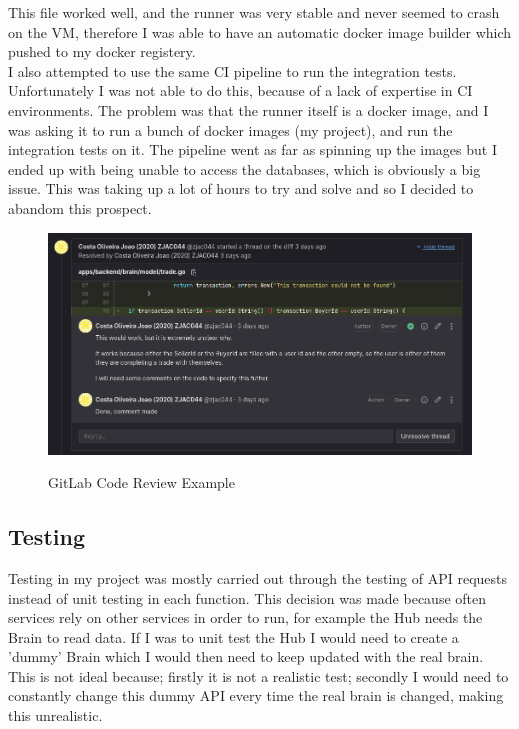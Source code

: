 \documentclass[titlepage]{article}
\begin{document}
This file worked well, and the runner was very stable and never seemed to crash on the VM, therefore I was able to have an automatic docker image builder which pushed to my docker registery. \\

I also attempted to use the same CI pipeline to run the integration tests. Unfortunately I was not able to do this, because of a lack of expertise in CI environments. The problem was that the runner itself is a docker image, and I was asking it to run a bunch of docker images (my project), and run the integration tests on it. The pipeline went as far as spinning up the images but I ended up with being unable to access the databases, which is obviously a big issue. This was taking up a lot of hours to try and solve and so I decided to abandom this prospect. 

\begin{figure}[h!]
  \caption{GitLab Code Review Example}
\hspace*{-3cm}
\includegraphics[width=1.5\textwidth]{../Diagrams/GitLab.png}
\label{gitlab}
\end{figure}

\pagebreak
\subsection{Testing}
Testing in my project was mostly carried out through the testing of API requests instead of unit testing in each function. This decision was made because often services rely on other services in order to run, for example the Hub needs the Brain to read data. If I was to unit test the Hub I would need to create a 'dummy' Brain which I would then need to keep updated with the real brain. This is not ideal because; firstly it is not a realistic test; secondly I would need to constantly change this dummy API every time the real brain is changed, making this unrealistic. \\
\end{document}
